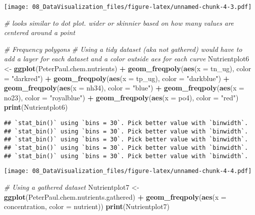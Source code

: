 \documentclass[]{article}
\newenvironment{Shaded}{\begin{snugshade}}{\end{snugshade}}
\newcommand{\KeywordTok}[1]{\textcolor[rgb]{0.13,0.29,0.53}{\textbf{#1}}}
\newcommand{\DataTypeTok}[1]{\textcolor[rgb]{0.13,0.29,0.53}{#1}}
\newcommand{\StringTok}[1]{\textcolor[rgb]{0.31,0.60,0.02}{#1}}
\newcommand{\CommentTok}[1]{\textcolor[rgb]{0.56,0.35,0.01}{\textit{#1}}}
\newcommand{\OperatorTok}[1]{\textcolor[rgb]{0.81,0.36,0.00}{\textbf{#1}}}
\newcommand{\NormalTok}[1]{#1}
\begin{document}
\texttt{[image: 08\_DataVisualization\_files/figure-latex/unnamed-chunk-4-3.pdf]}

\begin{Shaded}
\begin{Highlighting}[]
\CommentTok{# looks similar to dot plot. wider or skinnier based on how many values are centered around a point}

\CommentTok{# Frequency polygons}
\CommentTok{# Using a tidy dataset (aka not gathered) would have to add a layer for each dataset and a color outside aes for each curve}
\NormalTok{Nutrientplot6 <-}
\StringTok{  }\KeywordTok{ggplot}\NormalTok{(PeterPaul.chem.nutrients) }\OperatorTok{+}
\StringTok{  }\KeywordTok{geom_freqpoly}\NormalTok{(}\KeywordTok{aes}\NormalTok{(}\DataTypeTok{x =}\NormalTok{ tn_ug), }\DataTypeTok{color =} \StringTok{"darkred"}\NormalTok{) }\OperatorTok{+}
\StringTok{  }\KeywordTok{geom_freqpoly}\NormalTok{(}\KeywordTok{aes}\NormalTok{(}\DataTypeTok{x =}\NormalTok{ tp_ug), }\DataTypeTok{color =} \StringTok{"darkblue"}\NormalTok{) }\OperatorTok{+}
\StringTok{  }\KeywordTok{geom_freqpoly}\NormalTok{(}\KeywordTok{aes}\NormalTok{(}\DataTypeTok{x =}\NormalTok{ nh34), }\DataTypeTok{color =} \StringTok{"blue"}\NormalTok{) }\OperatorTok{+}
\StringTok{  }\KeywordTok{geom_freqpoly}\NormalTok{(}\KeywordTok{aes}\NormalTok{(}\DataTypeTok{x =}\NormalTok{ no23), }\DataTypeTok{color =} \StringTok{"royalblue"}\NormalTok{) }\OperatorTok{+}
\StringTok{  }\KeywordTok{geom_freqpoly}\NormalTok{(}\KeywordTok{aes}\NormalTok{(}\DataTypeTok{x =}\NormalTok{ po4), }\DataTypeTok{color =} \StringTok{"red"}\NormalTok{) }
\KeywordTok{print}\NormalTok{(Nutrientplot6)}
\end{Highlighting}
\end{Shaded}

\begin{verbatim}
## `stat_bin()` using `bins = 30`. Pick better value with `binwidth`.
## `stat_bin()` using `bins = 30`. Pick better value with `binwidth`.
## `stat_bin()` using `bins = 30`. Pick better value with `binwidth`.
## `stat_bin()` using `bins = 30`. Pick better value with `binwidth`.
## `stat_bin()` using `bins = 30`. Pick better value with `binwidth`.
\end{verbatim}

\texttt{[image: 08\_DataVisualization\_files/figure-latex/unnamed-chunk-4-4.pdf]}

\begin{Shaded}
\begin{Highlighting}[]
\CommentTok{# Using a gathered dataset}
\NormalTok{Nutrientplot7 <-}\StringTok{   }
\StringTok{  }\KeywordTok{ggplot}\NormalTok{(PeterPaul.chem.nutrients.gathered) }\OperatorTok{+}
\StringTok{  }\KeywordTok{geom_freqpoly}\NormalTok{(}\KeywordTok{aes}\NormalTok{(}\DataTypeTok{x =}\NormalTok{ concentration, }\DataTypeTok{color =}\NormalTok{ nutrient))}
\KeywordTok{print}\NormalTok{(Nutrientplot7)}
\end{Highlighting}
\end{Shaded}
\end{document}
